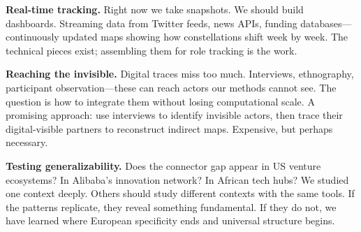 \documentclass[../main.tex]{subfiles}
\begin{document}
\begin{wideblock}
\begin{center}
\end{center}
\end{wideblock}

\textbf{Real-time tracking.} Right now we take snapshots. We should build dashboards. Streaming data from Twitter feeds, news APIs, funding databases---continuously updated maps showing how constellations shift week by week. The technical pieces exist; assembling them for role tracking is the work.

\textbf{Reaching the invisible.} Digital traces miss too much. Interviews, ethnography, participant observation---these can reach actors our methods cannot see. The question is how to integrate them without losing computational scale. A promising approach: use interviews to identify invisible actors, then trace their digital-visible partners to reconstruct indirect maps. Expensive, but perhaps necessary.

\textbf{Testing generalizability.} Does the connector gap appear in US venture ecosystems? In Alibaba's innovation network? In African tech hubs? We studied one context deeply. Others should study different contexts with the same tools. If the patterns replicate, they reveal something fundamental. If they do not, we have learned where European specificity ends and universal structure begins.
\end{document}
